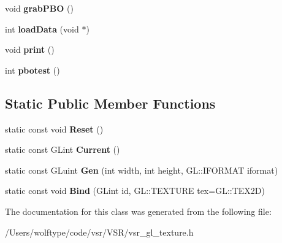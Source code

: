 \begin{DoxyCompactItemize}
\item 
\hypertarget{classvsr_1_1_texture_abfb1debadd19e48585404fba52e3dceb}{void {\bfseries grab\-P\-B\-O} ()}\label{classvsr_1_1_texture_abfb1debadd19e48585404fba52e3dceb}

\item 
\hypertarget{classvsr_1_1_texture_a1f849b08b59021733767090ffe625142}{int {\bfseries load\-Data} (void $\ast$)}\label{classvsr_1_1_texture_a1f849b08b59021733767090ffe625142}

\item 
\hypertarget{classvsr_1_1_texture_a82d9950592f14439d3d3bea712d60fa8}{void {\bfseries print} ()}\label{classvsr_1_1_texture_a82d9950592f14439d3d3bea712d60fa8}

\item 
\hypertarget{classvsr_1_1_texture_aa191f9417dff0bc3237ddb9318852d96}{int {\bfseries pbotest} ()}\label{classvsr_1_1_texture_aa191f9417dff0bc3237ddb9318852d96}

\end{DoxyCompactItemize}
\subsection*{Static Public Member Functions}
\begin{DoxyCompactItemize}
\item 
\hypertarget{classvsr_1_1_texture_a1e1651a73cd066196ef39c45d1770be2}{static const void {\bfseries Reset} ()}\label{classvsr_1_1_texture_a1e1651a73cd066196ef39c45d1770be2}

\item 
\hypertarget{classvsr_1_1_texture_ae9ae9b8612bdd4588b16f07086d3120d}{static const G\-Lint {\bfseries Current} ()}\label{classvsr_1_1_texture_ae9ae9b8612bdd4588b16f07086d3120d}

\item 
\hypertarget{classvsr_1_1_texture_a8f2afd68ce8363f8ae850cd70c7889ed}{static const G\-Luint {\bfseries Gen} (int width, int height, G\-L\-::\-I\-F\-O\-R\-M\-A\-T iformat)}\label{classvsr_1_1_texture_a8f2afd68ce8363f8ae850cd70c7889ed}

\item 
\hypertarget{classvsr_1_1_texture_a5c8e9ad579de008245cac6850be4590f}{static const void {\bfseries Bind} (G\-Lint id, G\-L\-::\-T\-E\-X\-T\-U\-R\-E tex=G\-L\-::\-T\-E\-X2\-D)}\label{classvsr_1_1_texture_a5c8e9ad579de008245cac6850be4590f}

\end{DoxyCompactItemize}


The documentation for this class was generated from the following file\-:\begin{DoxyCompactItemize}
\item 
/\-Users/wolftype/code/vsr/\-V\-S\-R/vsr\-\_\-gl\-\_\-texture.\-h\end{DoxyCompactItemize}
